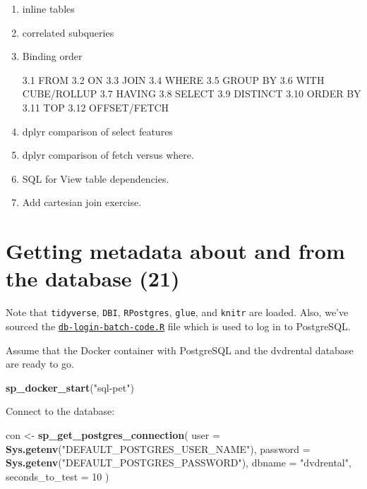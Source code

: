 \documentclass[]{book}
\newenvironment{Shaded}{\begin{snugshade}}{\end{snugshade}}
\newcommand{\DataTypeTok}[1]{\textcolor[rgb]{0.13,0.29,0.53}{#1}}
\newcommand{\DecValTok}[1]{\textcolor[rgb]{0.00,0.00,0.81}{#1}}
\newcommand{\KeywordTok}[1]{\textcolor[rgb]{0.13,0.29,0.53}{\textbf{#1}}}
\newcommand{\NormalTok}[1]{#1}
\newcommand{\StringTok}[1]{\textcolor[rgb]{0.31,0.60,0.02}{#1}}
\theoremstyle{definition}
\theoremstyle{definition}
\theoremstyle{definition}
\theoremstyle{remark}
\begin{document}
\begin{enumerate}
\def\labelenumi{\arabic{enumi}.}
\item
  inline tables
\item
  correlated subqueries
\item
  Binding order

  3.1 FROM 3.2 ON 3.3 JOIN 3.4 WHERE 3.5 GROUP BY 3.6 WITH CUBE/ROLLUP
  3.7 HAVING 3.8 SELECT 3.9 DISTINCT 3.10 ORDER BY 3.11 TOP 3.12
  OFFSET/FETCH
\item
  dplyr comparison of select features
\item
  dplyr comparison of fetch versus where.
\item
  SQL for View table dependencies.
\item
  Add cartesian join exercise.
\end{enumerate}

\hypertarget{getting-metadata-about-and-from-the-database-21}{%
\chapter{Getting metadata about and from the database
(21)}\label{getting-metadata-about-and-from-the-database-21}}

Note that \texttt{tidyverse}, \texttt{DBI}, \texttt{RPostgres},
\texttt{glue}, and \texttt{knitr} are loaded. Also, we've sourced the
\href{'book-src/db-login-batch-code.R'}{\texttt{db-login-batch-code.R}}
file which is used to log in to PostgreSQL.

Assume that the Docker container with PostgreSQL and the dvdrental
database are ready to go.

\begin{Shaded}
\begin{Highlighting}[]
\KeywordTok{sp_docker_start}\NormalTok{(}\StringTok{"sql-pet"}\NormalTok{)}
\end{Highlighting}
\end{Shaded}

Connect to the database:

\begin{Shaded}
\begin{Highlighting}[]
\NormalTok{con <-}\StringTok{  }\KeywordTok{sp_get_postgres_connection}\NormalTok{(}
  \DataTypeTok{user =} \KeywordTok{Sys.getenv}\NormalTok{(}\StringTok{"DEFAULT_POSTGRES_USER_NAME"}\NormalTok{),}
  \DataTypeTok{password =} \KeywordTok{Sys.getenv}\NormalTok{(}\StringTok{"DEFAULT_POSTGRES_PASSWORD"}\NormalTok{),}
  \DataTypeTok{dbname =} \StringTok{"dvdrental"}\NormalTok{,}
  \DataTypeTok{seconds_to_test =} \DecValTok{10}
\NormalTok{)}
\end{Highlighting}
\end{Shaded}
\end{document}

